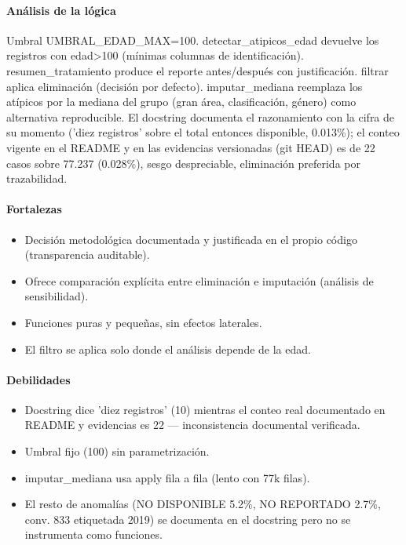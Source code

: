 \paragraph{Análisis de la lógica}
Umbral UMBRAL\_EDAD\_MAX=100. detectar\_atipicos\_edad devuelve los registros con edad>100 (mínimas columnas de identificación). resumen\_tratamiento produce el reporte antes/después con justificación. filtrar aplica eliminación (decisión por defecto). imputar\_mediana reemplaza los atípicos por la mediana del grupo (gran área, clasificación, género) como alternativa reproducible. El docstring documenta el razonamiento con la cifra de su momento ('diez registros' sobre el total entonces disponible, 0.013\%); el conteo vigente en el README y en las evidencias versionadas (git HEAD) es de 22 casos sobre 77.237 (0.028\%), sesgo despreciable, eliminación preferida por trazabilidad.

\paragraph{Fortalezas}
\begin{itemize}
  \item Decisión metodológica documentada y justificada en el propio código (transparencia auditable).
  \item Ofrece comparación explícita entre eliminación e imputación (análisis de sensibilidad).
  \item Funciones puras y pequeñas, sin efectos laterales.
  \item El filtro se aplica solo donde el análisis depende de la edad.
\end{itemize}

\paragraph{Debilidades}
\begin{itemize}
  \item Docstring dice 'diez registros' (10) mientras el conteo real documentado en README y evidencias es 22 --- inconsistencia documental verificada.
  \item Umbral fijo (100) sin parametrización.
  \item imputar\_mediana usa apply fila a fila (lento con 77k filas).
  \item El resto de anomalías (NO DISPONIBLE 5.2\%, NO REPORTADO 2.7\%, conv. 833 etiquetada 2019) se documenta en el docstring pero no se instrumenta como funciones.
\end{itemize}

